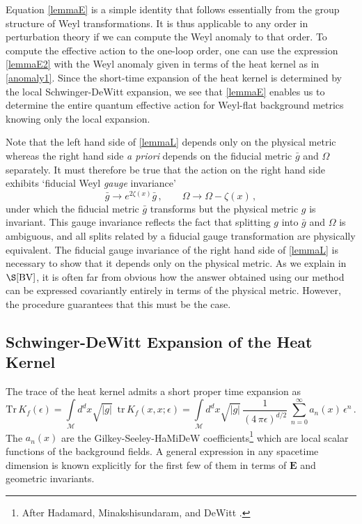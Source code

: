 \documentclass[12pt,a4paper]{article}
\newcommand{\be}{\begin{equation}}
\newcommand{\ee}{\end{equation}}
\newcommand{\e}{\epsilon}
\renewcommand{\O}{\Omega}
\newcommand{\1}{{\textbf{1}}}
\newcommand{\Tr}{\mbox{Tr}}
\newcommand{\+}{{\,+ \,}}
\begin{document}
 Equation \eqref{lemmaE} is  a simple identity that follows essentially from the group structure of Weyl transformations. It is thus applicable  to any order in perturbation theory if we can compute the Weyl anomaly to that order.   To compute the effective action to  the one-loop order,  one can use the expression \eqref{lemmaE2} with the Weyl anomaly given in terms of the heat kernel as in \eqref{anomaly1}. Since the short-time expansion of the heat kernel is determined by the local Schwinger-DeWitt expansion, we see that \eqref{lemmaE} enables us to determine the entire quantum effective action for Weyl-flat background metrics knowing only the local expansion. 

 
Note that the left hand side of \eqref{lemmaL} depends only on the physical metric whereas the right hand side \textit{a priori} depends on the fiducial metric $\bar g$ and $\Omega$ separately. It must therefore be true that the action on the right hand side exhibits  `fiducial Weyl \textit{gauge} invariance’ 
\be\label{fiducial}
\bar g \rightarrow e^{2\zeta(x)} \bar g\, , \qquad \Omega \rightarrow \O -\zeta(x) \, ,
\ee
under which the fiducial metric $\bar g$ transforms but the physical metric $g$ is invariant. This gauge invariance reflects the fact that  splitting  $g$ into $\bar g$ and $\Omega$ is ambiguous, and  all splits related by a fiducial gauge transformation are  physically  equivalent. 
The fiducial gauge invariance of the right hand side  of \eqref{lemmaL} is necessary to show that it depends only on the physical metric. 
As we explain in $\S\ref{BV}$, it is often far from obvious how the answer obtained using our method can be expressed covariantly entirely in terms of the physical metric. However, the procedure guarantees that this must be the case.

\subsection{Schwinger-DeWitt Expansion of the Heat Kernel}

The trace of the heat kernel admits a short proper time expansion as
\be
\Tr \,K_f(\e)=\int\limits_\mathcal{M} d^dx\sqrt{|g|}\, \,\,\text{tr}\, K_f(x,x;\e)=\int\limits_\mathcal{M} d^dx\sqrt{|g|}\,\frac{1}{(4\,\pi\e)^{d/2}}\,\sum_{n=0}^\infty a_n(x)\, \e^{n}\, .
\ee
The $a_n(x)$ are the Gilkey-Seeley-HaMiDeW \cite{Gilkey:1995mj,Seeley:1967ea,Seeley:1969re,Hadamard:2014le,Minakshisundaram:1949xg,Minakshisundaram:1953xh,DeWitt:1965jb,DeWitt:1967yk,DeWitt:1967ub,DeWitt:1967uc} coefficients\footnote{After Hadamard, Minakshisundaram,  and DeWitt \cite{Gibbons:1979ig,Barvinsky:2015bky}.} which are  local scalar functions of the background fields. A  general expression  in any spacetime dimension is known explicitly for the first few of them in terms of $\textbf{E}$ and geometric invariants. 
\end{document}
